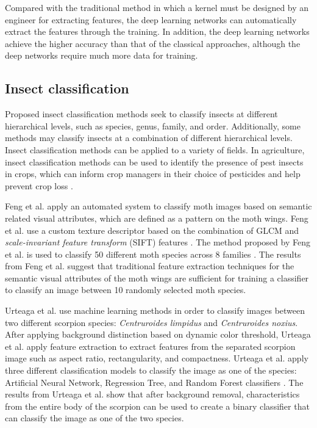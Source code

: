 \documentclass{aci}
\numberwithin{equation}{section}
\begin{document}
Compared with the traditional method in which a kernel must be designed by an
engineer for extracting features, the deep learning networks can automatically
extract the features through the training. In addition, the deep learning
networks achieve the higher accuracy than that of the classical approaches,
although the deep networks require much more data for training.

\subsection{Insect classification}

Proposed insect classification methods seek to classify insects at different
hierarchical levels, such as species, genus, family, and order. Additionally,
some methods may classify insects at a combination of different hierarchical
levels. Insect classification methods can be applied to a variety of fields. In
agriculture, insect classification methods can be used to identify the presence
of pest insects in crops, which can inform crop managers in their choice of
pesticides and help prevent crop loss \cite{liu_pestnet_2019,
    kasinathan_machine_2021}.

Feng et al. \cite{feng_automated_2013} apply an automated system to classify
moth images based on semantic related visual attributes, which are defined as a
pattern on the moth wings. Feng et al. \cite{feng_automated_2013} use a custom
texture descriptor based on the combination of GLCM and \textit{scale-invariant
    feature transform} (SIFT) features \cite{gotlieb_texture_1990,
    lowe_distinctive_2004}. The method proposed by Feng et al.
\cite{feng_automated_2013} is used to classify 50 different moth species across
8 families \cite{feng_automated_2013}. The results from Feng et al.
\cite{feng_automated_2013} suggest that traditional feature extraction
techniques for the semantic visual attributes of the moth wings are sufficient
for training a classifier to classify an image between 10 randomly selected moth
species.

Urteaga et al. \cite{urteaga_scorpions_2016} use machine learning methods in
order to classify images between two different scorpion species:
\textit{Centruroides limpidus} and \textit{Centruroides noxius}. After applying
background distinction based on dynamic color threshold, Urteaga et al.
\cite{urteaga_scorpions_2016} apply feature extraction to extract features from
the separated scorpion image such as aspect ratio, rectangularity, and
compactness. Urteaga et al. \cite{urteaga_scorpions_2016} apply three different
classification models to classify the image as one of the species: Artificial
Neural Network, Regression Tree, and Random Forest classifiers
\cite{urteaga_scorpions_2016}. The results from Urteaga et al.
\cite{urteaga_scorpions_2016} show that after background removal,
characteristics from the entire body of the scorpion can be used to create a
binary classifier that can classify the image as one of the two species.
\end{document}
